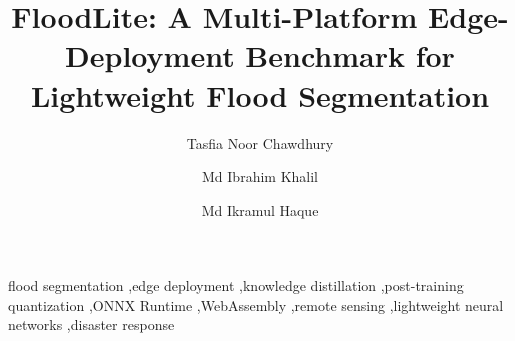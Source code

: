 \documentclass[final,3p,times,twocolumn]{elsarticle}
\begin{document}
\sloppy

\begin{frontmatter}

\title{FloodLite: A Multi-Platform Edge-Deployment Benchmark for Lightweight Flood Segmentation}

\author[affA]{Tasfia Noor Chawdhury}
\author[sensa]{Md Ibrahim Khalil}
\author[affC]{Md Ikramul Haque}%





\begin{keyword}
flood segmentation \sep edge deployment \sep knowledge distillation \sep post-training quantization \sep ONNX Runtime \sep WebAssembly \sep remote sensing \sep lightweight neural networks \sep disaster response
\end{keyword}

\end{frontmatter}















\appendix

\end{document}
